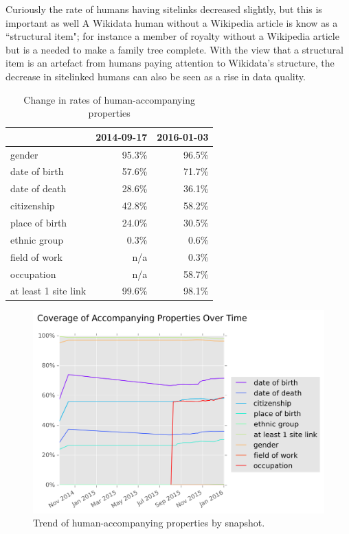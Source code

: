 \documentclass[letterpaper]{article}
\begin{document}
Curiously the rate of humans having sitelinks decreased slightly, but this is important as well A Wikidata human without a Wikipedia article is know as a ``structural item"; for instance a member of royalty without a Wikipedia article but is a needed to make a family tree complete. With the view that a structural item is an artefact from humans paying attention to Wikidata's structure, the decrease in sitelinked humans can also be seen as a rise in data quality.


\begin{table}
\caption{Change in rates of human-accompanying properties}
\begin{tabular}{lrr}
\toprule
{} &  2014-09-17 &  2016-01-03 \\
\midrule
gender               &       95.3\% &       96.5\% \\
date of birth        &       57.6\% &       71.7\% \\
date of death        &       28.6\% &       36.1\% \\
citizenship          &       42.8\% &       58.2\% \\
place of birth       &       24.0\% &       30.5\% \\
ethnic group         &        0.3\% &        0.6\% \\
field of work        &        n/a &        0.3\% \\
occupation           &        n/a &       58.7\% \\
at least 1 site link &       99.6\% &       98.1\% \\
\bottomrule
\end{tabular}
\label{table:accompanying}
\end{table}

\begin{figure}
\label{fig:accompanying}
\includegraphics[scale=0.5]{figures/additionalprops.png} 
\caption{Trend of human-accompanying properties by snapshot.}
\end{figure}
\end{document}
